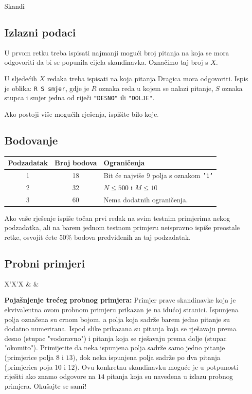 \begin{statement}[
  problempoints=110,
  timelimit=1 sekunda,
  memorylimit=512 MiB,
]{Skandi}
\subsection*{Izlazni podaci}
U prvom retku treba ispisati najmanji mogući broj pitanja na koja se mora
odgovoriti da bi se popunila cijela skandinavka. Označimo taj broj s $X$.

U sljedećih $X$ redaka treba ispisati na koja pitanja Dragica mora odgovoriti.
Ispis je oblika: \texttt{R S smjer}, gdje je $R$ oznaka reda u kojem se
nalazi pitanje, $S$ oznaka stupca i smjer jedna od riječi \texttt{"DESNO"}
ili \texttt{"DOLJE"}.

Ako postoji više mogućih rješenja, ispišite bilo koje.

\subsection*{Bodovanje}
{\renewcommand{\arraystretch}{1.4}
  \setlength{\tabcolsep}{6pt}
  \begin{tabular}{ccl}
 Podzadatak & Broj bodova & Ograničenja \\ \midrule
  1 & 18 & Bit će najviše $9$ polja s oznakom \texttt{'1'} \\
  2 & 32 & $N \le 500$ i $M \le 10$\\
  3 & 60 & Nema dodatnih ograničenja. \\
\end{tabular}}

Ako vaše rješenje ispiše točan prvi redak na svim testnim primjerima nekog
podzadatka, ali na barem jednom testnom primjeru neispravno ispiše preostale
retke, osvojit ćete $50$\% bodova predviđenih za taj podzadatak.

\subsection*{Probni primjeri}
\begin{tabularx}{\textwidth}{X'X'X}
 &
 &
\end{tabularx}

\textbf{Pojašnjenje trećeg probnog primjera:}
Primjer prave skandinavke koja je ekvivalentna ovom probnom primjeru prikazan
je na idućoj stranici. Ispunjena polja označena su crnom bojom, a polja koja
sadrže barem jedno pitanje su dodatno numerirana. Ispod slike prikazana su
pitanja koja se rješavaju prema desno (stupac "vodoravno") i pitanja koja se
rješavaju prema dolje (stupac "okomito"). Primijetite da neka ispunjena polja
sadrže samo jedno pitanje (primjerice polja $8$ i $13$), dok neka ispunjena
polja sadrže po dva pitanja (primjerica poja $10$ i $12$). Ovu konkretnu
skandinavku moguće je u potpunosti riješiti ako znamo odgovore na $14$ pitanja
koja su navedena u izlazu probnog primjera. Okušajte se sami!


\end{statement}
